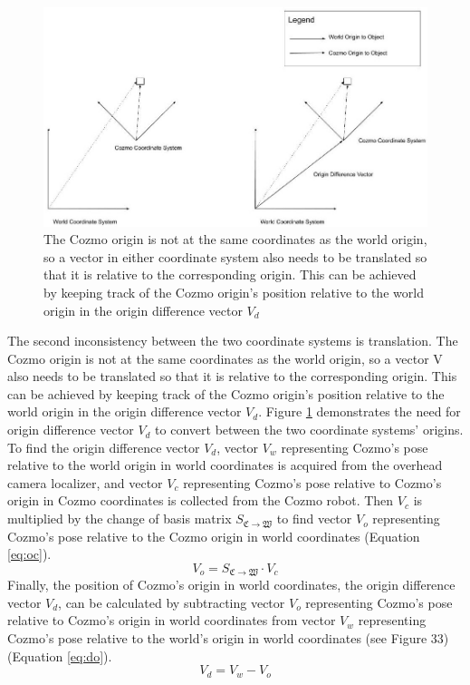 \documentclass[jou,apacite]{apa6}
\begin{document}
\begin{figure}
	\includegraphics[width=\linewidth]{origin_difference.jpg}
	\caption{The Cozmo origin is not at the same coordinates as the world origin, so a vector in either coordinate system also needs to be translated so that it is relative to the corresponding origin. This can be achieved by keeping track of the Cozmo origin's position relative to the world origin in the origin difference vector $V_d$}
	\label{fig:oridiff}
\end{figure}


The second inconsistency between the two coordinate systems is translation. The Cozmo origin is not at the same coordinates as the world origin, so a vector V also needs to be translated so that it is relative to the corresponding origin. This can be achieved by keeping track of the Cozmo origin's position relative to the world origin in the origin difference vector $V_d$. Figure \ref{fig:oridiff} demonstrates the need for origin difference vector $V_d$ to convert between the two coordinate systems' origins. To find the origin difference vector $V_d$, vector $V_w$ representing Cozmo's pose relative to the world origin in world coordinates is acquired from the overhead camera localizer, and vector $V_c$ representing Cozmo's pose relative to Cozmo's origin in Cozmo coordinates is collected from the Cozmo robot. Then $V_c$ is multiplied by the change of basis matrix $S_{\mathfrak{C}\rightarrow\mathfrak{W}}$ to find vector $V_o$ representing Cozmo's pose relative to the Cozmo origin in world coordinates (Equation \ref{eq:oc}).
\begin{equation} \label{eq:oc}
	V_o = S_{\mathfrak{C}\rightarrow\mathfrak{W}} \cdot V_c
\end{equation}
Finally, the position of Cozmo's origin in world coordinates, the origin difference vector $V_d$, can be calculated by subtracting vector $V_o$ representing Cozmo's pose relative to Cozmo's origin in world coordinates from vector $V_w$ representing Cozmo's pose relative to the world's origin in world coordinates (see Figure 33)  (Equation \ref{eq:do}). 
\begin{equation} \label{eq:do}
	V_d = V_w - V_o
\end{equation}
\end{document}
